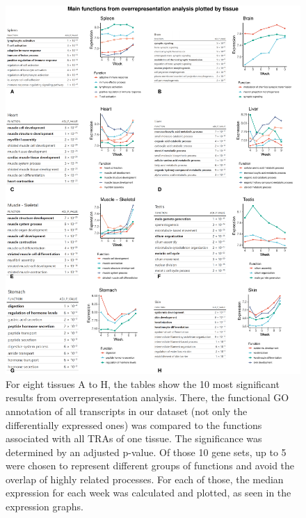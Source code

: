 \documentclass[
]{article}
\begin{document}
\begin{figure}
\centering
\includegraphics{final_report_files/figure-latex/ORA-plot-1.pdf}
\caption{\label{fig:ORA-plot}For eight tissues A to H, the tables show the 10 most significant results from overrepresentation analysis. There, the functional GO annotation of all transcripts in our dataset (not only the differentially expressed ones) was compared to the functions associated with all TRAs of one tissue. The significance was determined by an adjusted p-value. Of those 10 gene sets, up to 5 were chosen to represent different groups of functions and avoid the overlap of highly related processes. For each of those, the median expression for each week was calculated and plotted, as seen in the expression graphs.}
\end{figure}
\end{document}
